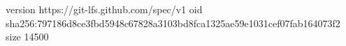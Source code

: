 version https://git-lfs.github.com/spec/v1
oid sha256:797186d8ce3fbd5948c67828a3103bd8fca1325ae59e1031cef07fab164073f2
size 14500
